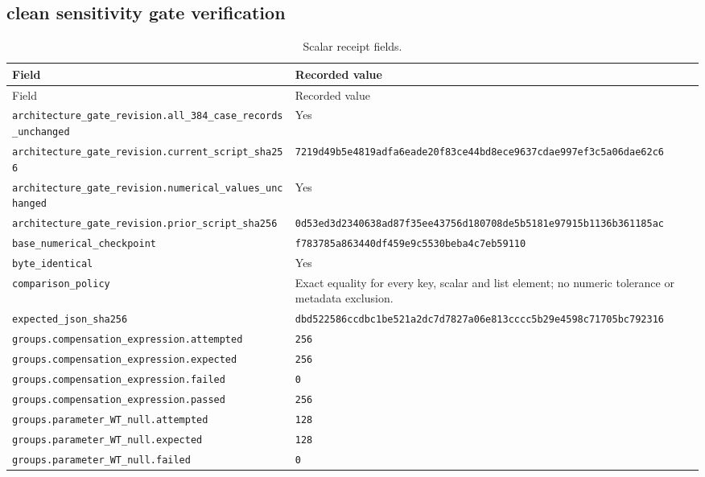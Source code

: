 
\subsection*{clean sensitivity gate verification}

\begingroup\scriptsize
\setlength{\tabcolsep}{3pt}
\begin{longtable}{p{.46\linewidth}p{.46\linewidth}}
\caption{Scalar receipt fields.}\\
\toprule
Field & Recorded value \\
\midrule\endfirsthead
\toprule
Field & Recorded value \\
\midrule\endhead
\bottomrule\endfoot
\nolinkurl{architecture_gate_revision.all_384_case_records_unchanged} & Yes \\
\nolinkurl{architecture_gate_revision.current_script_sha256} & \nolinkurl{7219d49b5e4819adfa6eade20f83ce44bd8ece9637cdae997ef3c5a06dae62c6} \\
\nolinkurl{architecture_gate_revision.numerical_values_unchanged} & Yes \\
\nolinkurl{architecture_gate_revision.prior_script_sha256} & \nolinkurl{0d53ed3d2340638ad87f35ee43756d180708de5b5181e97915b1136b361185ac} \\
\nolinkurl{base_numerical_checkpoint} & \nolinkurl{f783785a863440df459e9c5530beba4c7eb59110} \\
\nolinkurl{byte_identical} & Yes \\
\nolinkurl{comparison_policy} & Exact equality for every key, scalar and list element; no numeric tolerance or metadata exclusion. \\
\nolinkurl{expected_json_sha256} & \nolinkurl{dbd522586ccdbc1be521a2dc7d7827a06e813cccc5b29e4598c71705bc792316} \\
\nolinkurl{groups.compensation_expression.attempted} & \texttt{256} \\
\nolinkurl{groups.compensation_expression.expected} & \texttt{256} \\
\nolinkurl{groups.compensation_expression.failed} & \texttt{0} \\
\nolinkurl{groups.compensation_expression.passed} & \texttt{256} \\
\nolinkurl{groups.parameter_WT_null.attempted} & \texttt{128} \\
\nolinkurl{groups.parameter_WT_null.expected} & \texttt{128} \\
\nolinkurl{groups.parameter_WT_null.failed} & \texttt{0} \\

\end{longtable}
